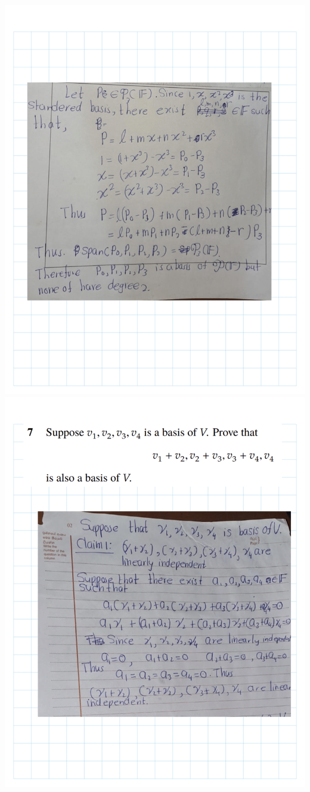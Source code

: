 \documentclass[
]{book}
\theoremstyle{definition}
\theoremstyle{definition}
\theoremstyle{definition}
\theoremstyle{definition}
\theoremstyle{remark}
\begin{document}
\includegraphics{fig/Ex 2B and 2C/EX2B (15).png}
\includegraphics{fig/Ex 2B and 2C/EX2B (16).png}
\end{document}
